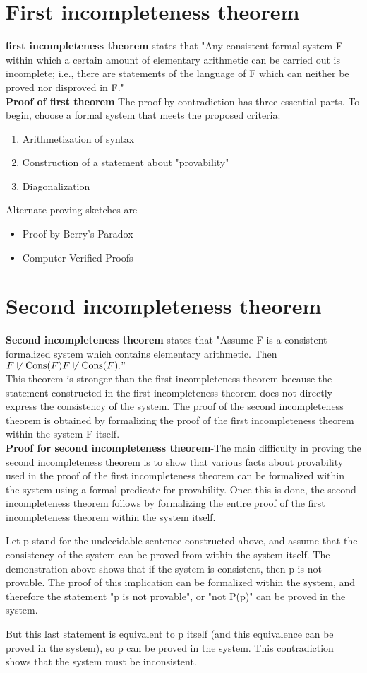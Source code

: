 \documentclass[a4paper]{article}
\begin{document}
\section{First incompleteness theorem}
\textbf{first incompleteness theorem} states that "Any consistent formal system F within which a certain amount of elementary arithmetic can be carried out is incomplete; i.e., there are statements of the language of F which can neither be proved nor disproved in F."\\
\textbf{Proof of first theorem}-The proof by contradiction has three essential parts. To begin, choose a formal system that meets the proposed criteria:
\begin{enumerate}
    \item Arithmetization of syntax
    \item Construction of a statement about "provability"
    \item Diagonalization
\end{enumerate}
Alternate proving sketches are
\begin{itemize}
    \item Proof by Berry's Paradox
    \item Computer Verified Proofs
\end{itemize}
\bigskip

\section{Second incompleteness theorem}
\textbf{Second incompleteness theorem}-states that  "Assume F is a consistent formalized system which contains elementary arithmetic. Then ${\displaystyle F\not \vdash {\text{Cons}}(F)}{\displaystyle F\not \vdash {\text{Cons}}(F)}."$\\
This theorem is stronger than the first incompleteness theorem because the statement constructed in the first incompleteness theorem does not directly express the consistency of the system. The proof of the second incompleteness theorem is obtained by formalizing the proof of the first incompleteness theorem within the system F itself.\\
\textbf{Proof for second incompleteness theorem}-The main difficulty in proving the second incompleteness theorem is to show that various facts about provability used in the proof of the first incompleteness theorem can be formalized within the system using a formal predicate for provability. Once this is done, the second incompleteness theorem follows by formalizing the entire proof of the first incompleteness theorem within the system itself.

Let p stand for the undecidable sentence constructed above, and assume that the consistency of the system can be proved from within the system itself. The demonstration above shows that if the system is consistent, then p is not provable. The proof of this implication can be formalized within the system, and therefore the statement "p is not provable", or "not P(p)" can be proved in the system.

But this last statement is equivalent to p itself (and this equivalence can be proved in the system), so p can be proved in the system. This contradiction shows that the system must be inconsistent.
\end{document}
